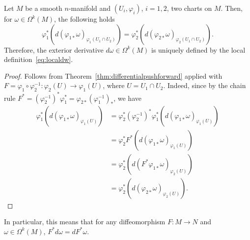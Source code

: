 \begin{corollary}
  Let $M$ be a smooth $n$-manifold and $(U_i, \varphi_i)$, $i=1,2$, two charts on $M$.
  Then, for $\omega\in\Omega^k(M)$, the following holds
  \begin{equation}
    \varphi_1^*\left(d(\varphi_{1*}\omega)_{\varphi_1(U_1\cap U_2)}\right) =
    \varphi_2^*\left(d(\varphi_{2*}\omega)_{\varphi_2(U_1\cap U_2)}\right).
  \end{equation}
  Therefore, the exterior derivative $d\omega\in\Omega^k(M)$ is uniquely defined by the local definition~\eqref{eq:localdw}.
\end{corollary}
\begin{proof}
  Follows from Theorem~\ref{thm:differentialpushforward} applied with $F = \varphi_1\circ\varphi_2^{-1} : \varphi_2(U) \to \varphi_1(U)$, where $U=U_1\cap U_2$.
  Indeed, since by the chain rule $F^* = (\varphi_2^{-1})^*\varphi_1^* = \varphi_{2*}(\varphi_1^{-1})_*$, we have
  \begin{align}
    \varphi_1^*\left(d(\varphi_{1*}\omega)_{\varphi_1(U)}\right)
    &= \varphi_2^* (\varphi_2^{-1})^* \varphi_1^*\left(d(\varphi_{1*}\omega)_{\varphi_1(U)}\right) \\
    &= \varphi_2^* F^*\left(d(\varphi_{1*}\omega)_{\varphi_1(U)}\right) \\
    &= \varphi_2^* \left(d(F^*\varphi_{1*}\omega)_{\varphi_2(U)}\right) \\
    &= \varphi_2^* \left(d(\varphi_{2*}\omega)_{\varphi_2(U)}\right).
  \end{align}
\end{proof}

In particular, this means that for any diffeomorphism $F:M\to N$ and $\omega\in\Omega^k(M)$, $F^*d\omega = d F^*\omega$.

